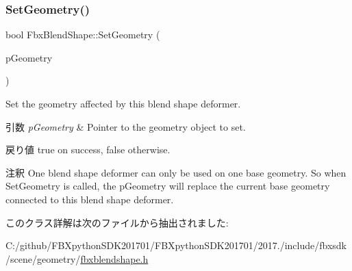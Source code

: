 \subsubsection{\texorpdfstring{Set\+Geometry()}{SetGeometry()}}
{\footnotesize\ttfamily bool Fbx\+Blend\+Shape\+::\+Set\+Geometry (\begin{DoxyParamCaption}\item[{\hyperlink{class_fbx_geometry}{Fbx\+Geometry} $\ast$}]{p\+Geometry }\end{DoxyParamCaption})}

Set the geometry affected by this blend shape deformer. 
\begin{DoxyParams}{引数}
{\em p\+Geometry} & Pointer to the geometry object to set. \\
\hline
\end{DoxyParams}
\begin{DoxyReturn}{戻り値}
{\ttfamily true} on success, {\ttfamily false} otherwise. 
\end{DoxyReturn}
\begin{DoxyRemark}{注釈}
One blend shape deformer can only be used on one base geometry. So when Set\+Geometry is called, the p\+Geometry will replace the current base geometry connected to this blend shape deformer. 
\end{DoxyRemark}


このクラス詳解は次のファイルから抽出されました\+:\begin{DoxyCompactItemize}
\item 
C\+:/github/\+F\+B\+Xpython\+S\+D\+K201701/\+F\+B\+Xpython\+S\+D\+K201701/2017./include/fbxsdk/scene/geometry/\hyperlink{fbxblendshape_8h}{fbxblendshape.\+h}\end{DoxyCompactItemize}
